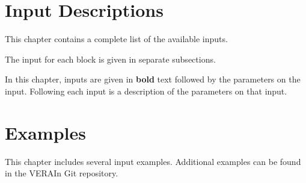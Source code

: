 \documentclass{vera-ornltm}
\begin{document}




















\section{Input Descriptions} \label{chap:inputs}
This chapter contains a complete list of the available inputs.

The input for each block is given in separate subsections.

In this chapter, inputs are given in {\bf bold} text followed by the parameters on the input.
Following each input is a description of the parameters on that input.



\clearpage
\section{Examples}
\label{chap:example}

This chapter includes several input examples.  Additional examples can be found in the VERAIn Git repository.
\end{document}
